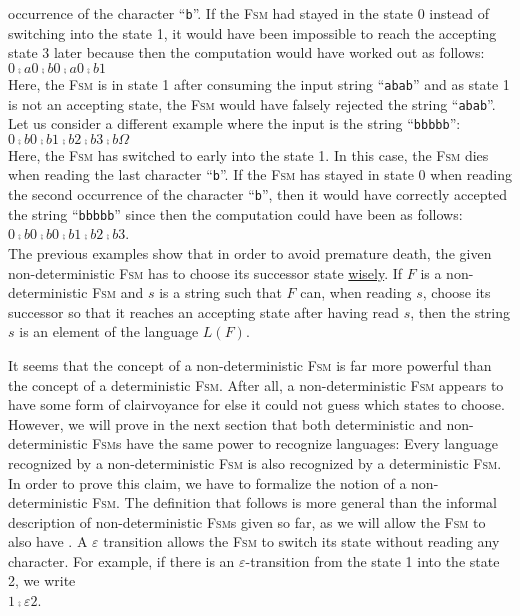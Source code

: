 occurrence of the character ``\texttt{b}''.  If the \textsc{Fsm} had stayed in the state 0 instead
of switching into the state 1, it would have been impossible to reach the accepting state 3 later
because then the computation would have worked out as follows:
\\[0.2cm]
\hspace*{1.3cm}
$0 \comp{a} 0 \comp{b} 0 \comp{a} 0 \comp{b} 1$
\\[0.2cm] 
Here, the \textsc{Fsm} is in state 1 after consuming the input string ``\texttt{abab}'' and as state
1 is not an accepting state, the \textsc{Fsm} would have falsely rejected the string ``\texttt{abab}''.
Let us consider a different example where the input is the string ``\texttt{bbbbb}'':
\\[0.2cm]
\hspace*{1.3cm}
$0 \comp{b} 0 \comp{b} 1 \comp{b} 2 \comp{b} 3 \comp{b} \Omega$
\\[0.2cm]
Here, the \textsc{Fsm} has switched to early into the state 1.  In this case, the \textsc{Fsm} dies
when reading the last character ``\texttt{b}''.  If the \textsc{Fsm} has stayed in state 0 when reading the second
occurrence of the character ``\texttt{b}'', then it would have correctly accepted the string
``\texttt{bbbbb}'' since then the computation could have been as follows:
\\[0.2cm]
\hspace*{1.3cm}
$0 \comp{b} 0 \comp{b} 0 \comp{b} 1 \comp{b} 2 \comp{b} 3$.
\\[0.2cm]
The previous examples show that in order to avoid premature death, the given non-deterministic \textsc{Fsm} has
to choose its successor state
\href{https://www.youtube.com/watch?v=c3RN9zz77Cs}{wisely}.  
If $F$ is a non-deterministic \textsc{Fsm} and $s$ is a string such that $F$ can, when reading $s$,
choose its successor so that it reaches an accepting state after having read $s$, then the string
$s$ is an element of the language $L(F)$.

It seems that the concept of a non-deterministic \textsc{Fsm} is far more powerful than the 
concept of a deterministic \textsc{Fsm}.  After all, a non-deterministic \textsc{Fsm} appears to
have some form of clairvoyance for else it could not guess which states to choose.  However, we will
prove in the 
next section that both deterministic and non-deterministic \textsc{Fsm}s have the same power to
recognize languages:  Every language recognized by a non-deterministic \textsc{Fsm} is also
recognized by a deterministic \textsc{Fsm}.  In order to prove this claim, we have to
formalize the notion of a non-deterministic \textsc{Fsm}.  The definition that follows is more
general than the informal description of non-deterministic \textsc{Fsm}s given so far, as we will
allow the \textsc{Fsm} to also have .  A $\varepsilon$ transition
allows the \textsc{Fsm} to switch its state without reading any character.  For example, if there is
an $\varepsilon$-transition from the state 1 into the state 2, we write
\\[0.2cm]
\hspace*{1.3cm}
$1 \comp{\varepsilon} 2$.


